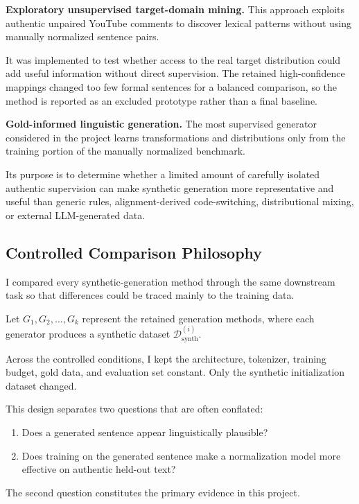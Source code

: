 \documentclass[12pt, a4paper, twoside, openany]{report}
\begin{document}
\noindent\textbf{Exploratory unsupervised target-domain mining.}
This approach exploits authentic unpaired YouTube comments to discover lexical patterns without using manually normalized sentence pairs.

It was implemented to test whether access to the real target distribution could add useful information without direct supervision. The retained high-confidence mappings changed too few formal sentences for a balanced comparison, so the method is reported as an excluded prototype rather than a final baseline.

\noindent\textbf{Gold-informed linguistic generation.}
The most supervised generator considered in the project learns transformations and distributions only from the training portion of the manually normalized benchmark.

Its purpose is to determine whether a limited amount of carefully isolated authentic supervision can make synthetic generation more representative and useful than generic rules, alignment-derived code-switching, distributional mixing, or external LLM-generated data.


\subsection{Controlled Comparison Philosophy}

I compared every synthetic-generation method through the same downstream task so that differences could be traced mainly to the training data.

Let $G_1,G_2,\ldots,G_k$ represent the retained generation methods, where each generator produces a synthetic dataset $\mathcal{D}^{(i)}_{\text{synth}}$.

Across the controlled conditions, I kept the architecture, tokenizer, training budget, gold data, and evaluation set constant. Only the synthetic initialization dataset changed.

This design separates two questions that are often conflated:

\begin{enumerate}
	\item Does a generated sentence appear linguistically plausible?

	\item Does training on the generated sentence make a normalization model more effective on authentic held-out text?
\end{enumerate}

The second question constitutes the primary evidence in this project.
\end{document}
